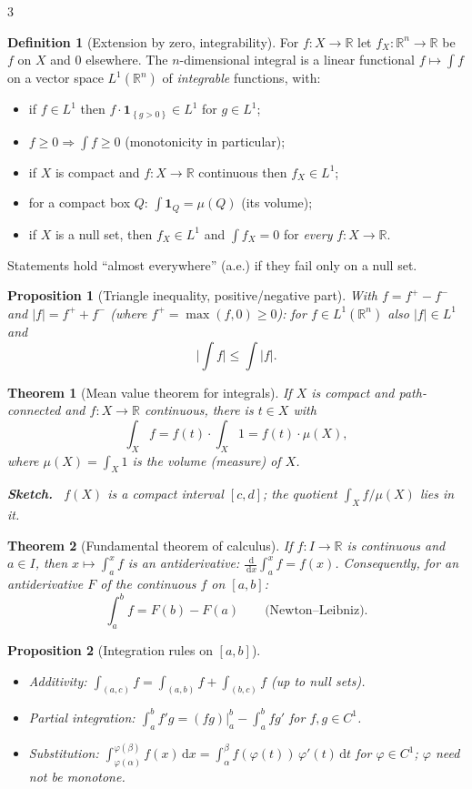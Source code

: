 \documentclass[10pt,a4paper,landscape]{article}
\theoremstyle{definition}
\newtheorem{defn}{Definition}[section]
\theoremstyle{plain}
\newtheorem{thm}{Theorem}[section]
\newtheorem{prop}{Proposition}[section]
\theoremstyle{remark}
\newcommand{\R}{\mathbb{R}}
\newcommand{\dd}{\,\mathrm{d}}
\newcommand{\abs}[1]{\lvert #1 \rvert}
\newcommand{\set}[1]{\left\{ #1 \right\}}
\newcommand{\One}[1]{\mathbf{1}_{#1}}
\newenvironment{proofsketch}{%
  \par\small\color{exgray}\textbf{Sketch.}\ }%
  {\par}
\begin{document}
\begin{multicols*}{3}
\begin{defn}[Extension by zero, integrability]
For $f: X \to \R$ let $f_X: \R^n \to \R$ be $f$ on $X$ and $0$ elsewhere. The $n$-dimensional integral is a linear functional $f \mapsto \int f$ on a vector space $L^1(\R^n)$ of \emph{integrable} functions, with:
\begin{itemize}
\item if $f \in L^1$ then $f \cdot \One{\set{g > 0}} \in L^1$ for $g \in L^1$;
\item $f \ge 0 \Rightarrow \int f \ge 0$ (monotonicity in particular);
\item if $X$ is compact and $f: X \to \R$ continuous then $f_X \in L^1$;
\item for a compact box $Q$: $\int \One{Q} = \mu(Q)$ (its volume);
\item if $X$ is a null set, then $f_X \in L^1$ and $\int f_X = 0$ for \emph{every} $f: X \to \R$.
\end{itemize}
Statements hold ``almost everywhere'' (a.e.) if they fail only on a null set.
\end{defn}

\begin{prop}[Triangle inequality, positive/negative part]
With $f = f^+ - f^-$ and $\abs{f} = f^+ + f^-$ (where $f^+ = \max(f,0) \ge 0$): for $f \in L^1(\R^n)$ also $\abs{f} \in L^1$ and
\[
\abs{\textstyle\int f} \le \int \abs{f} .
\]
\end{prop}

\begin{thm}[Mean value theorem for integrals]
If $X$ is compact and path-connected and $f: X \to \R$ continuous, there is $t \in X$ with
\[
\int_X f = f(t) \cdot \textstyle\int_X 1 = f(t) \cdot \mu(X),
\]
where $\mu(X) = \int_X 1$ is the volume (measure) of $X$.
\begin{proofsketch}
$f(X)$ is a compact interval $[c,d]$; the quotient $\int_X f/\mu(X)$ lies in it.
\end{proofsketch}
\end{thm}

\begin{thm}[Fundamental theorem of calculus]
If $f: I \to \R$ is continuous and $a \in I$, then $x \mapsto \int_a^x f$ is an antiderivative: $\frac{\dd}{\dd x}\int_a^x f = f(x)$. Consequently, for an antiderivative $F$ of the continuous $f$ on $[a,b]$:
\[
\int_a^b f = F(b) - F(a) \qquad \text{(Newton--Leibniz).}
\]
\end{thm}

\begin{prop}[Integration rules on ${[a,b]}$]
\begin{itemize}
\item Additivity: $\int_{(a,c)} f = \int_{(a,b)} f + \int_{(b,c)} f$ (up to null sets).
\item Partial integration: $\int_a^b f' g = (fg)\bigl|_a^b - \int_a^b f g'$ for $f, g \in C^1$.
\item Substitution: $\int_{\varphi(\alpha)}^{\varphi(\beta)} f(x) \dd x = \int_\alpha^\beta f(\varphi(t))\, \varphi'(t) \dd t$ for $\varphi \in C^1$; $\varphi$ need not be monotone.
\end{itemize}
\end{prop}


\end{multicols*}
\end{document}
